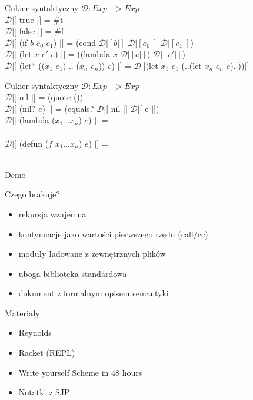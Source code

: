 \documentclass[12pt,serif]{beamer}
\begin{document}
\begin{frame}{Cukier syntaktyczny}
$\mathcal{D} : Exp -> Exp$ \newline
\\
$\mathcal{D}|[$ true $|]$ = \#t \\
$\mathcal{D}|[$ false $|]$ = \#f \newline
\\
$\mathcal{D}|[$ (if $b$ $e_0$ $e_1$) $|]$ =
   (cond $\mathcal{D}|[ b |]$ $\mathcal{D}|[ e_0 |]$ $\mathcal{D}|[ e_1 |]$) \newline
\\
$\mathcal{D}|[$ (let $x$ $e'$ $e$) $|]$ =
   ((lambda $x$ $\mathcal{D}|[e|]$) $\mathcal{D}|[e'|]$) \\
$\mathcal{D}|[$ (let* (($x_1$ $e_1$) .. ($x_n$ $e_n$)) $e$) $|]$ = 
   $\mathcal{D}|[$(let $x_1$ $e_1$ (..(let $x_n$ $e_n$ $e$)..))$|]$ \\
\end{frame}

\begin{frame}{Cukier syntaktyczny}
$\mathcal{D} : Exp -> Exp$ \newline
\\
$\mathcal{D}|[$ nil $|]$ = (quote ()) \\
$\mathcal{D}|[$ (nil? $e$) $|]$ = 
   (equals? $\mathcal{D}|[$ nil $|]$ $\mathcal{D}|[$ e $|]$) \newline
\\
$\mathcal{D}|[$ (lambda ($x_1 \ldots x_n$) $e$) $|]$ = \\
\newline
\\
$\mathcal{D}|[$ (defun ($f$ $x_1 \ldots x_n$) $e$) $|]$ = \\ 
\\

\end{frame}


\begin{frame}
\begin{center}
   \LARGE{Demo}
\end{center}
\end{frame}

\begin{frame}{Czego brakuje?}
\begin{itemize}
   \item rekursja wzajemna
   \item kontynuacje jako wartości pierwszego rzędu (call/cc)
   \item moduły ładowane z zewnętrznych plików
   \item uboga biblioteka standardowa
   \item dokument z formalnym opisem semantyki
\end{itemize}
\end{frame}

\begin{frame}{Materiały}
\begin{itemize}
   \item Reynolds
   \item Racket (REPL)
   \item Write yourself Scheme in 48 hours
   \item Notatki z SJP
\end{itemize}
\end{frame}
\end{document}
